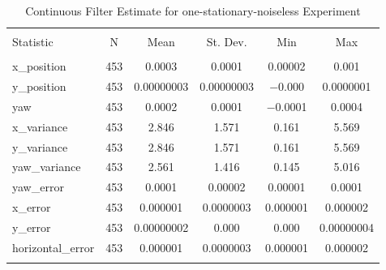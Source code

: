 
\begin{table}[h] \centering 
  \caption{Continuous Filter Estimate for one-stationary-noiseless Experiment} 
  \label{tab:one_stationary_noiseless_continuous_summary} 
\begin{tabular}{@{\extracolsep{5pt}}lccccc} 
\\[-1.8ex]\hline 
\hline \\[-1.8ex] 
Statistic & \multicolumn{1}{c}{N} & \multicolumn{1}{c}{Mean} & \multicolumn{1}{c}{St. Dev.} & \multicolumn{1}{c}{Min} & \multicolumn{1}{c}{Max} \\ 
\hline \\[-1.8ex] 
x\_position & 453 & \num{0.0003} & \num{0.0001} & \num{0.00002} & \num{0.001} \\ 
y\_position & 453 & \num{0.00000003} & \num{0.00000003} & $-$\num{0.000} & \num{0.0000001} \\ 
yaw & 453 & \num{0.0002} & \num{0.0001} & $-$\num{0.0001} & \num{0.0004} \\ 
x\_variance & 453 & \num{2.846} & \num{1.571} & \num{0.161} & \num{5.569} \\ 
y\_variance & 453 & \num{2.846} & \num{1.571} & \num{0.161} & \num{5.569} \\ 
yaw\_variance & 453 & \num{2.561} & \num{1.416} & \num{0.145} & \num{5.016} \\ 
yaw\_error & 453 & \num{0.0001} & \num{0.00002} & \num{0.00001} & \num{0.0001} \\ 
x\_error & 453 & \num{0.000001} & \num{0.0000003} & \num{0.000001} & \num{0.000002} \\ 
y\_error & 453 & \num{0.00000002} & \num{0.000} & \num{0.000} & \num{0.00000004} \\ 
horizontal\_error & 453 & \num{0.000001} & \num{0.0000003} & \num{0.000001} & \num{0.000002} \\ 
\hline \\[-1.8ex] 
\end{tabular} 
\end{table} 
